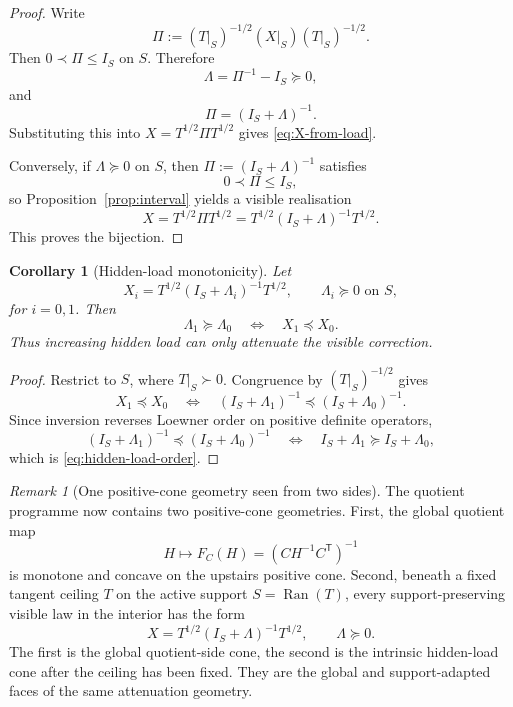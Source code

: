 \documentclass[11pt]{article}
\numberwithin{equation}{section}
\theoremstyle{thmcompact}
\newtheorem{corollary}[theorem]{Corollary}
\theoremstyle{remark}
\newtheorem*{remarkplain}{Remark}
\newenvironment{remark}[1][]%
{\begin{remarkbox}\begin{remarkplain}[#1]\normalfont}
		{\end{remarkplain}\end{remarkbox}}
\begin{document}
\begin{proof}
Write
\[
\Pi:=(T|_S)^{-1/2}(X|_S)(T|_S)^{-1/2}.
\]
Then $0\prec \Pi\le I_S$ on $S$. Therefore
\[
\Lambda=\Pi^{-1}-I_S \succeq 0,
\]
and
\[
\Pi=(I_S+\Lambda)^{-1}.
\]
Substituting this into $X=T^{1/2}\Pi T^{1/2}$ gives \eqref{eq:X-from-load}.

Conversely, if $\Lambda\succeq 0$ on $S$, then $\Pi:=(I_S+\Lambda)^{-1}$ satisfies
\[
0\prec \Pi\le I_S,
\]
so Proposition~\ref{prop:interval} yields a visible realisation
\[
X=T^{1/2}\Pi T^{1/2}=T^{1/2}(I_S+\Lambda)^{-1}T^{1/2}.
\]
This proves the bijection.
\end{proof}

\begin{corollary}[Hidden-load monotonicity]\label{cor:hidden-load-monotone}
Let
\[
X_i=T^{1/2}(I_S+\Lambda_i)^{-1}T^{1/2},
\qquad \Lambda_i\succeq 0 \text{ on } S,
\]
for $i=0,1$. Then
\begin{equation}\label{eq:hidden-load-order}
\Lambda_1\succeq \Lambda_0
\quad\Longleftrightarrow\quad
X_1\preceq X_0.
\end{equation}
Thus increasing hidden load can only attenuate the visible correction.
\end{corollary}

\begin{proof}
Restrict to $S$, where $T|_S\succ 0$. Congruence by $(T|_S)^{-1/2}$ gives
\[
X_1\preceq X_0
\quad\Longleftrightarrow\quad
(I_S+\Lambda_1)^{-1}\preceq (I_S+\Lambda_0)^{-1}.
\]
Since inversion reverses Loewner order on positive definite operators,
\[
(I_S+\Lambda_1)^{-1}\preceq (I_S+\Lambda_0)^{-1}
\quad\Longleftrightarrow\quad
I_S+\Lambda_1 \succeq I_S+\Lambda_0,
\]
which is \eqref{eq:hidden-load-order}.
\end{proof}

\begin{remark}[One positive-cone geometry seen from two sides]
The quotient programme now contains two positive-cone geometries. First, the global quotient map
\[
H \mapsto F_C(H)=(CH^{-1}C^{\mathsf T})^{-1}
\]
is monotone and concave on the upstairs positive cone. Second, beneath a fixed tangent ceiling $T$ on the active support $S=\operatorname{Ran}(T)$, every support-preserving visible law in the interior has the form
\[
X=T^{1/2}(I_S+\Lambda)^{-1}T^{1/2},
\qquad \Lambda\succeq 0.
\]
The first is the global quotient-side cone, the second is the intrinsic hidden-load cone after the ceiling has been fixed. They are the global and support-adapted faces of the same attenuation geometry.
\end{remark}
\end{document}
